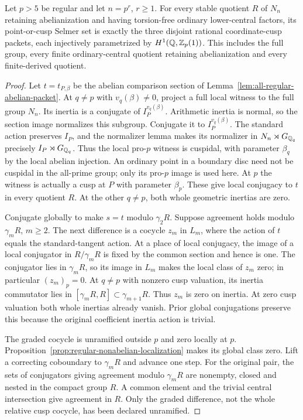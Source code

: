 \begin{theorem}
\label{thm:all-regular-prime-packets}
Let \(p>5\) be regular and let \(n=p^r\), \(r\ge1\).
For every stable quotient $R$ of $N_n$ retaining abelianization
and having torsion-free ordinary lower-central factors, its
point-or-cusp Selmer set is exactly the three disjoint rational
coordinate-cusp packets, each injectively parametrized by
$H^1(\mathbb Q,\mathbb Z_p(1))$. This includes the full group, every finite
ordinary-central quotient retaining abelianization and every
finite-derived quotient.
\end{theorem}
\begin{proof}
Let $t=t_{P,\beta}$ be the abelian comparison section of
Lemma~\ref{lem:all-regular-abelian-packet}.
At $q\ne p$ with $v_q(\beta)\ne0$, project a full local witness
to the full group $N_n$. Its inertia is a conjugate of
$I_P^{v_q(\beta)}$. Arithmetic inertia is normal, so the section
image normalizes this subgroup. Conjugate it to $I_P^{v_q(\beta)}$.
The standard action preserves $I_P$, and the normalizer lemma
makes its normalizer in $N_n\rtimes G_{\mathbb Q_q}$ precisely
$I_P\rtimes G_{\mathbb Q_q}$. Thus the local pro-$p$ witness is
cuspidal, with parameter $\beta_q$ by the local abelian injection.
An ordinary point in a boundary disc need not be cuspidal in the
all-prime group; only its pro-$p$ image is used here.
At $p$ the witness is actually a cusp at $P$ with parameter
$\beta_p$. These give local conjugacy to $t$ in every quotient $R$.
At the other $q\ne p$, both whole geometric inertias are zero.

Conjugate globally to make $s=t$ modulo $\gamma_2R$.
Suppose agreement holds modulo $\gamma_mR$, $m\ge2$.
The next difference is a cocycle $z_m$ in $L_m$, where the action
of $t$ equals the standard-tangent action.
At a place of local conjugacy, the image of a local conjugator
in $R/\gamma_mR$ is fixed by the common section and hence is one.
The conjugator lies in $\gamma_mR$, so its image in $L_m$
makes the local class of $z_m$ zero; in particular $(z_m)_p=0$.
At $q\ne p$ with nonzero cusp valuation, its inertia commutator
lies in $[\gamma_mR,R]\subset\gamma_{m+1}R$. Thus $z_m$ is zero
on inertia. At zero cusp valuation both whole inertias already
vanish. Prior global conjugations preserve this because the
original coefficient inertia action is trivial.

The graded cocycle is unramified outside $p$ and zero locally at
$p$. Proposition~\ref{prop:regular-nonabelian-localization} makes
its global class zero. Lift a correcting coboundary to $\gamma_mR$
and advance one step. For the original pair, the sets of conjugators
giving agreement modulo $\gamma_mR$ are nonempty, closed and nested
in the compact group $R$. A common element and the trivial central
intersection give agreement in $R$. Only the graded difference,
not the whole relative cusp cocycle, has been declared unramified.


\end{proof}
